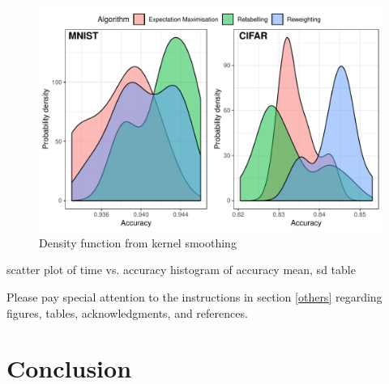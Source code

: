 \documentclass[12pt]{article} %
\begin{document}
\begin{figure}    
	\includegraphics[scale=0.9]{histo.pdf}
	\caption{Density function from kernel smoothing}
	\label{fig:Density function from kernel smoothing}
\end{figure}

scatter plot of time vs. accuracy
histogram of accuracy
mean, sd table

Please pay special attention to the instructions in section \ref{others}
regarding figures, tables, acknowledgments, and references.

\section{Conclusion}
\label{headings}





\end{document}

